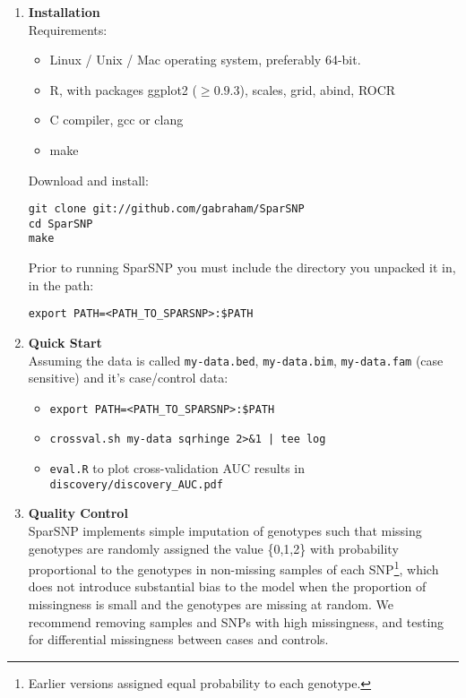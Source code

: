 \documentclass[a4paper,11pt]{article}
\begin{document}
\begin{enumerate}

   \item \textbf{Installation}\\

   Requirements:\\
   
      \begin{itemize}
	 \item Linux / Unix / Mac operating system, preferably 64-bit.
	 \item \textsf{R}, with packages ggplot2 ($\ge 0.9.3$), scales, grid, abind, ROCR
	 \item C compiler, gcc or clang
	 \item make
      \end{itemize}

   Download and install:
\begin{verbatim}
git clone git://github.com/gabraham/SparSNP
cd SparSNP
make
\end{verbatim}

   Prior to running SparSNP you must include the directory you unpacked it in, in the path:
\begin{verbatim}
export PATH=<PATH_TO_SPARSNP>:$PATH
\end{verbatim}

   \item \textbf{Quick Start}\\

   Assuming the data is called \texttt{my-data.bed}, \texttt{my-data.bim},
   \texttt{my-data.fam} (case sensitive) and it's case/control data:

      \begin{itemize}
	 \item \texttt{export PATH=<PATH\_TO\_SPARSNP>:\$PATH}
	 \item \texttt{crossval.sh my-data sqrhinge 2>\&1 | tee log}
	 \item \texttt{eval.R} to plot cross-validation AUC results in
	 \texttt{discovery/discovery\_AUC.pdf}
      \end{itemize}
   

   \item \textbf{Quality Control}\\
      SparSNP implements simple imputation of genotypes such that missing
      genotypes are randomly assigned the value \{0,1,2\} with probability
      proportional to the genotypes in non-missing samples of each
      SNP\footnote{Earlier versions assigned equal probability to each
      genotype.}, which
      does not introduce substantial bias to the model when the proportion of
      missingness is small and the genotypes are missing at random. We recommend
      removing samples and SNPs with high missingness, and testing for
      differential missingness between cases and controls.


\end{enumerate}
\end{document}

